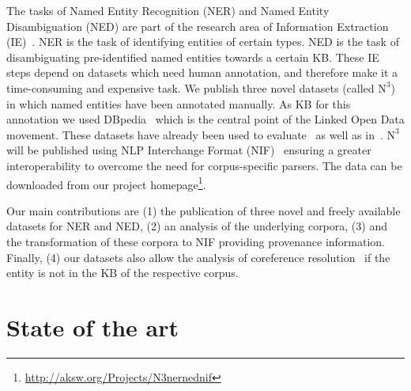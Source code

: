 \documentclass[10pt, a4paper]{article}
\begin{document}
The tasks of Named Entity Recognition (NER) and Named Entity Disambiguation (NED) are part of the research area of Information Extraction (IE)~\cite{fox}.
NER is the task of identifying entities of certain types.
NED is the task of disambiguating pre-identified named entities towards a certain KB.
These IE steps depend on datasets which need human annotation, and therefore make it a time-consuming and expensive task.
We publish three novel datasets (called $\mbox{N}^3$) in which named entities have been annotated manually. As KB for this annotation we used DBpedia~\cite{dbpedia_iswc} which is the central point of the Linked Open Data movement. These datasets have already been used to evaluate~\cite{AIDA,spotlight} as well as in~\cite{GER+13,Usbeck2013}.
$\mbox{N}^3$ will be published using NLP Interchange Format (NIF)~\cite{ISWC2013NIF} ensuring a greater interoperability to overcome the need for corpus-specific parsers. 
The data can be downloaded from our project homepage\footnote{\url{http://aksw.org/Projects/N3nernednif}}.

Our main contributions are
(1) the publication of three novel and freely available datasets for NER and NED,
(2) an analysis of the underlying corpora,
(3) and the transformation of these corpora to NIF providing provenance information.
Finally, (4) our datasets also allow the analysis of coreference resolution~\cite{singh} if the entity is not in the KB of the respective corpus.

\section{State of the art}
\end{document}
